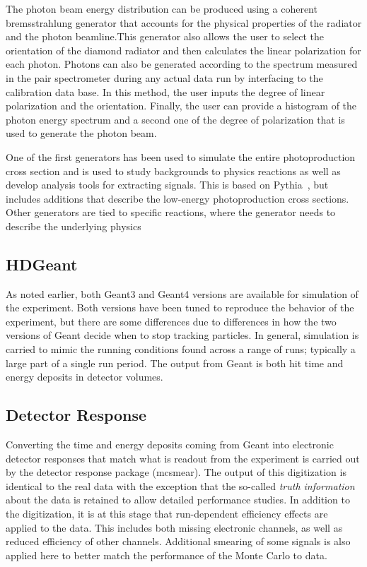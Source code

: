 The photon beam energy distribution can be produced using a coherent bremsstrahlung generator that accounts for the physical properties of the radiator and the photon beamline.This generator also allows the user to select the orientation of the diamond radiator and then calculates the linear polarization for each photon. Photons can also be generated according to the spectrum measured in the pair spectrometer during any actual data run by interfacing to the calibration data base. In this method, the user inputs the degree of linear polarization and the orientation. Finally, the user can provide a histogram of the photon energy spectrum and a second one of the degree of polarization that is used to generate the photon beam. 

One of the first generators has been used to simulate the entire photoproduction cross section and is used to study backgrounds to physics reactions as well as develop analysis tools for extracting signals. This is based on Pythia~\cite{Sjostrand:2006za}, but includes additions that describe the low-energy photoproduction cross sections. Other generators are tied to specific reactions, where the generator needs to describe the underlying physics

\subsection{HDGeant \label{sec:hdgeant}}
As noted earlier, both Geant3 and Geant4 versions are available for simulation of the experiment. Both versions have been tuned to reproduce the behavior of the experiment, but there are some differences due to differences in how the two versions of Geant decide when to stop tracking particles. In general, simulation is carried to mimic the running conditions found across a range of runs; typically a large part of a single run period. The output from Geant is both hit time and energy deposits in detector volumes. 

\subsection[mcsmear]{Detector Response}
Converting the time and energy deposits coming from Geant into electronic detector responses that match what is readout from the experiment is carried out by the detector response package (mcsmear). The output of this digitization is identical to the real data with the exception that the so-called \emph{truth information} about the data is retained to allow detailed performance studies. In addition to the digitization, it is at this stage that run-dependent efficiency effects are applied to the data. This includes both missing electronic channels, as well as reduced efficiency of other channels. Additional smearing of some signals is also applied here to better match the performance of the Monte Carlo to data. 


